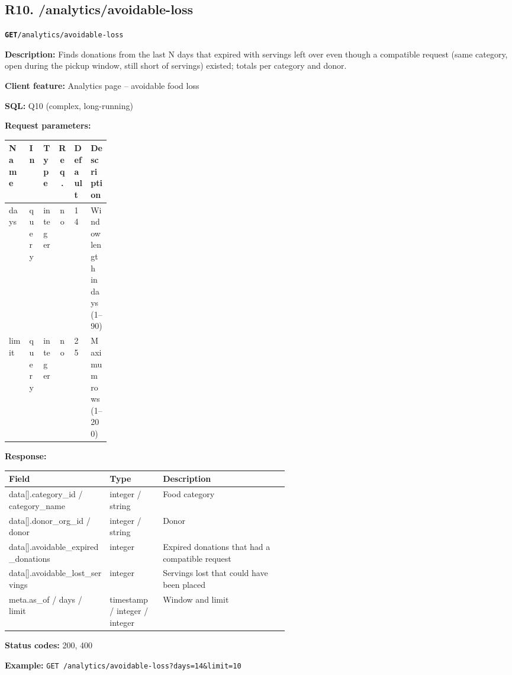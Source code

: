 \documentclass[11pt,letterpaper]{article}
\newcommand{\brk}{\penalty0\relax}
\newcommand{\routebar}[2]{%
  \par\noindent\colorbox{boxGray}{\parbox{\dimexpr\linewidth-2\fboxsep}{%
  \strut\textbf{\texttt{#1}}\quad\texttt{#2}\strut}}\par\smallskip}
\newcommand{\kv}[2]{\textbf{#1:} #2\par}
\begin{document}
\subsection*{R10. /analytics/avoidable-loss}
\routebar{GET}{/analytics/avoidable-loss}
\kv{Description}{Finds donations from the last N days that expired with servings left over even though a compatible request (same category, open during the pickup window, still short of servings) existed; totals per category and donor.}
\kv{Client feature}{Analytics page -- avoidable food loss}
\kv{SQL}{Q10 (complex, long-running)}
\kv{Request parameters}{}
\begin{xltabular}{\linewidth}{>{\ttfamily\raggedright\arraybackslash}p{0.2\linewidth} l l c l >{\raggedright\arraybackslash}X}
\toprule
\textrm{\textbf{Name}} & \textbf{In} & \textbf{Type} & \textbf{Req.} & \textbf{Default} & \textbf{Description} \\
\midrule
days & query & integer & no & 14 & Window length in days (1--90) \\
limit & query & integer & no & 25 & Maximum rows (1--200) \\
\bottomrule
\end{xltabular}
\kv{Response}{}
\begin{xltabular}{\linewidth}{>{\ttfamily\raggedright\arraybackslash}p{0.36\linewidth} >{\raggedright\arraybackslash}p{0.19\linewidth} >{\raggedright\arraybackslash}X}
\toprule
\textrm{\textbf{Field}} & \textbf{Type} & \textbf{Description} \\
\midrule
data[].\brk{}category\_id /\brk{} category\_name & integer / string & Food category \\
data[].\brk{}donor\_org\_id /\brk{} donor & integer / string & Donor \\
data[].\brk{}avoidable\_expired\_donations & integer & Expired donations that had a compatible request \\
data[].\brk{}avoidable\_lost\_servings & integer & Servings lost that could have been placed \\
meta.\brk{}as\_of /\brk{} days /\brk{} limit & timestamp / integer / integer & Window and limit \\
\bottomrule
\end{xltabular}
\kv{Status codes}{200, 400}
{\raggedright\textbf{Example:} {\small \texttt{GET /\brk{}analytics/\brk{}avoidable-loss?\brk{}days=\brk{}14\&\brk{}limit=\brk{}10}}\par}
\end{document}

